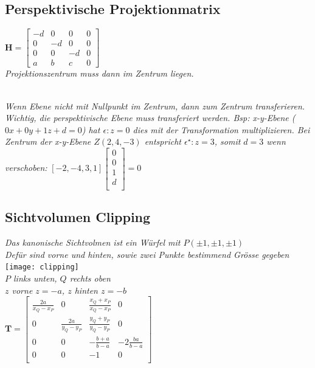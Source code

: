 \subsection{Perspektivische Projektionmatrix}

$\mathbf{H} = \begin{bmatrix}
    -d & 0 & 0 & 0 \\
    0 & -d & 0 & 0 \\
    0 & 0 & -d & 0 \\
    a & b & c & 0
\end{bmatrix}$ \\

\textit{Projektionszentrum muss dann im Zentrum liegen.}

\textit{\\
    Wenn Ebene nicht mit Nullpunkt im Zentrum, dann zum Zentrum transferieren.
    Wichtig, die perspektivische Ebene muss transferiert werden. Bsp: x-y-Ebene ($0x + 0y + 1z + d = 0$) hat $\epsilon: z = 0$
    dies mit der Transformation multiplizieren. Bei Zentrum der x-y-Ebene $Z(2,4,-3)$ entspricht
    $\epsilon^\star: z = 3$, somit $d = 3$ wenn verschoben:
}
$[-2, -4, 3, 1] \begin{bmatrix}
    0 \\ 0 \\ 1 \\ d \\
\end{bmatrix} = 0$ \\

\subsection{Sichtvolumen Clipping}

\textit{Das kanonische Sichtvolmen ist ein Würfel mit $P(\pm 1, \pm 1, \pm 1)$} \\
\textit{Defür sind vorne und hinten, sowie zwei Punkte bestimmend Grösse gegeben} \\

\texttt{[image: clipping]} \\

\textit{$P$ links unten, $Q$ rechts oben} \\
\textit{$z$ vorne $z=-a$, $z$ hinten $z=-b$} \\

$\mathbf{T} = \begin{bmatrix}
    \frac{2a}{x_Q - x_P} & 0 & \frac{x_Q + x_P}{x_Q - x_P} & 0 \\
    0 & \frac{2a}{y_Q - y_P} & \frac{y_Q + y_P}{y_Q - y_P} & 0 \\
    0 & 0 & -\frac{b+a}{b-a} & -2\frac{ba}{b-a} \\
    0 & 0 & -1 & 0 \\
\end{bmatrix}$